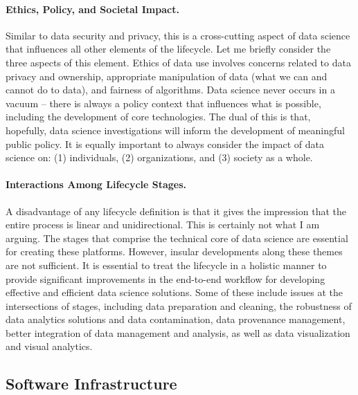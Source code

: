 \documentclass[11pt]{article}
\begin{document}
\paragraph{Ethics, Policy, and Societal Impact.} Similar to data security and privacy, this is a cross-cutting aspect of data science that influences all other elements of the lifecycle. Let me briefly consider the three aspects of this element. Ethics of data use involves concerns related to data privacy and ownership, appropriate manipulation of data (what we can and cannot do to data), and fairness of algorithms. Data science never occurs in a vacuum -- there is always a policy context that influences what is possible, including the development of core technologies. The dual of this is that, hopefully, data science investigations will inform the development of meaningful public policy. It is equally important to always consider the impact of data science on: (1) individuals, (2) organizations, and (3) society as a whole.

\paragraph{Interactions Among Lifecycle Stages.} A disadvantage of any lifecycle definition is that it gives the impression that the entire process is linear and unidirectional. This is certainly not what I am arguing. The stages that comprise the technical core of data science are essential for creating these platforms. However, insular developments along these themes are not sufficient. It is essential to treat the lifecycle in a holistic manner to provide significant improvements in the end-to-end workflow for developing effective and efficient data science solutions. Some of these include issues at the intersections of stages, including data preparation and cleaning, the robustness of data analytics solutions and data contamination, data provenance management, better integration of data management and analysis, as well as data visualization and visual analytics.

\subsection{Software Infrastructure}
\end{document}
